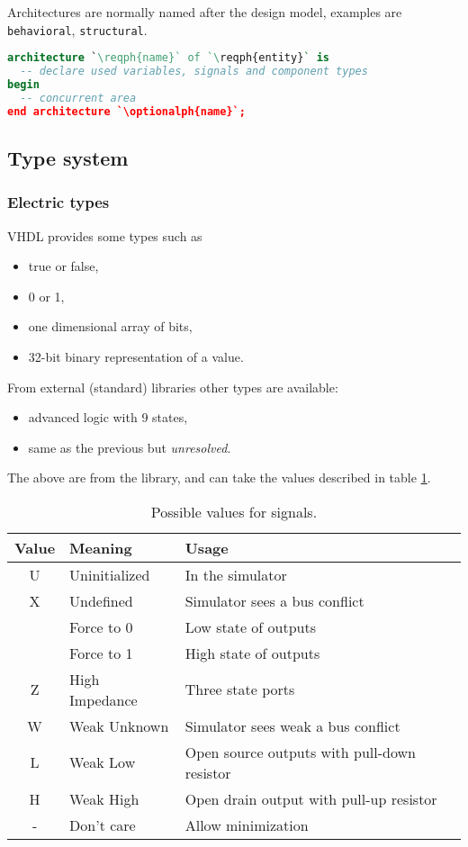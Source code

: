 Architectures are normally named after the design model, examples are
\texttt{behavioral}, \texttt{structural}.
\begin{lstlisting}[language=vhdl]
architecture `\reqph{name}` of `\reqph{entity}` is
  -- declare used variables, signals and component types
begin
  -- concurrent area
end architecture `\optionalph{name}`;
\end{lstlisting}

\subsection{Type system}
\subsubsection{Electric types}
VHDL provides some types such as
\begin{itemize}
  \item {} true or false,
  \item {} 0 or 1,
  \item {} one dimensional array of bits,
  \item {} 32-bit binary representation of a value.
\end{itemize}
From external (standard) libraries other types are available:
\begin{itemize}
  \item {} advanced logic with 9 states,
  \item {} same as the previous but \emph{unresolved}.
\end{itemize}
The above are from the  library, and can take the
values described in table \ref{tab:std-logic-1164-types}.
\begin{table}[h]
  \centering
  \begin{tabularx}{\linewidth}{>{\ttfamily}c l X}
    \toprule
    \textrm{Value} & Meaning & Usage \\
    \midrule
    U & Uninitialized  & In the simulator \\
    X & Undefined      & Simulator sees a bus conflict \\
    0 & Force to 0     & Low state of outputs \\
    1 & Force to 1     & High state of outputs \\
    Z & High Impedance & Three state ports \\
    W & Weak Unknown   & Simulator sees weak a bus conflict \\
    L & Weak Low       & Open source outputs with pull-down resistor \\
    H & Weak High      & Open drain output with pull-up resistor \\
    - & Don't care     & Allow minimization \\
    \bottomrule
  \end{tabularx}
  \caption{
    Possible values for  signals.
    \label{tab:std-logic-1164-types}
  }
\end{table}
